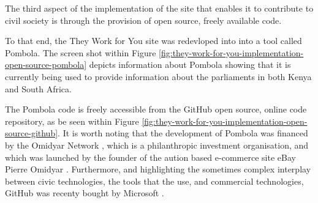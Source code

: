 The third aspect of the implementation of the site that enables it to contribute to civil society is through the provision of open source, freely available code.

To that end, the They Work for You site was redevloped into into a tool called Pombola.
The screen shot within Figure \ref{fig:they-work-for-you-implementation-open-source-pombola} depicts information about Pombola showing that it is currently being used to provide information about the parliaments in both Kenya and South Africa.

The Pombola code \cite{mysociety-github} is freely accessible from the GitHub \cite{github} open source, online code repository, as be seen within Figure \ref{fig:they-work-for-you-implementation-open-source-github}.
It is worth noting that the development of Pombola was financed by the Omidyar Network \cite{omidyar-network}, which is a philanthropic investment organisation, and which was launched by the founder of the aution based e-commerce site eBay \cite{ebay} Pierre Omidyar \cite{pierre-omidyar}.
Furthermore, and highlighting the sometimes complex interplay between civic technologies, the tools that the use, and commercial technologies, GitHub was recenty bought by Microsoft \cite{microsoft-buys-github}.